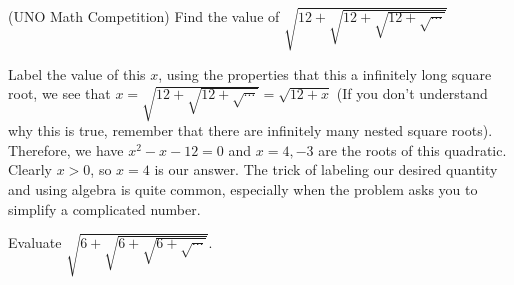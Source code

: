 \documentclass[11pt]{article}
\begin{document}
\begin{itemize}
    \begin{example}{(UNO Math Competition)}
        Find the value of $\sqrt{12+\sqrt{12+\sqrt{12+\sqrt{\cdots}}}}$
    \end{example}
    Label the value of this $x$, using the properties that this a infinitely long square root, we see that $x=\sqrt{12+\sqrt{12+\sqrt{\cdots}}} = \sqrt{12+x}$ (If you don't understand why this is true, remember that there are infinitely many nested square roots). Therefore, we have $x^2-x-12=0$ and $x=4, -3$ are the roots of this quadratic. Clearly $x>0$, so $x=4$ is our answer.
    The trick of labeling our desired quantity and using algebra is quite common, especially when the problem asks you to simplify a complicated number.
    \begin{exercise}
    Evaluate $\sqrt{6+\sqrt{6+\sqrt{6+\sqrt{\cdots}}}}$.
    \end{exercise}


\end{itemize}
\end{document}
